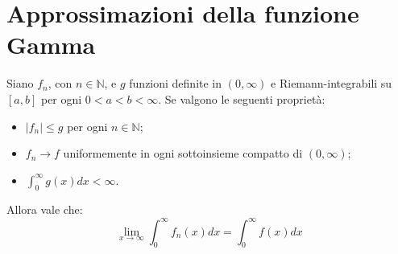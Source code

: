 \section{Approssimazioni della funzione Gamma}
\begin{lemma}
Siano $f_n$, con $n\in\mathbb{N}$, e $g$ funzioni definite in $(0,\infty)$ e Riemann-integrabili su $[a,b]$ per ogni
$0<a<b<\infty$. Se valgono le seguenti proprietà:
\begin{itemize}
 \item $|f_n|\le g$ per ogni $n\in\mathbb{N}$;
 \item $f_n\to f$ uniformemente in ogni sottoinsieme compatto di $(0,\infty)$;
 \item $\int_0^\infty{g(x)dx}<\infty$.
\end{itemize}
Allora vale che:
\begin{equation*}
 \lim_{x\to\infty}\int_0^\infty f_n(x)dx=\int_0^\infty f(x)dx
\end{equation*}
\end{lemma}

